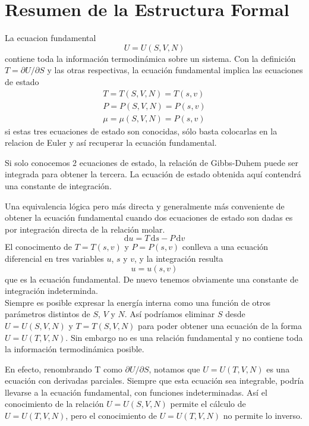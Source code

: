 \documentclass[10pt,twocolumn]{IEEEtran2e}
\newcommand{\ud}{\mathrm{d}}
\begin{document}
\section{Resumen de la Estructura Formal}
La ecuacion fundamental
\begin{equation}
 U=U(S,V,N)
\end{equation}
contiene toda la informaci\'on termodin\'amica sobre un sistema. Con la definici\'on $T=\partial U/\partial S$ y las otras respectivas, la ecuaci\'on fundamental implica las ecuaciones de estado
\begin{eqnarray}
T = T(S,V,N) = T(s,v) \\
P = P(S,V,N) = P(s,v) \\
\mu =\mu (S,V,N) = P(s,v)
\end{eqnarray}
si estas tres ecuaciones de estado son conocidas, s\'olo basta colocarlas en la relacion de Euler y as\'i recuperar la ecuaci\'on fundamental.

Si solo conocemos 2 ecuaciones de estado, la relaci\'on de Gibbs-Duhem puede ser integrada para obtener la tercera. La ecuaci\'on de estado obtenida aqu\'i contendr\'a una constante de integraci\'on.

Una equivalencia l\'ogica pero m\'as directa y generalmente m\'as conveniente de obtener la ecuaci\'on fundamental cuando dos ecuaciones de estado son dadas es por integraci\'on directa de la relaci\'on molar.
\begin{equation}
 \ud u = T\,\ud s - P\,\ud v
\end{equation}
El conocimento de $T=T(s,v)$ y $P=P(s,v)$ conlleva a una ecuaci\'on diferencial en tres variables $u$, $s$ y $v$, y la integraci\'on resulta
\begin{equation}
 u=u(s,v)
\end{equation}
que es la ecuaci\'on fundamental. De nuevo tenemos obviamente una constante de integraci\'on indeterminda.\\

Siempre es posible expresar la energ\'ia interna como una funci\'on de otros par\'ametros distintos de $S$, $V$ y $N$. As\'i podr\'iamos eliminar $S$ desde $U=U(S,V,N)$ y $T=T(S,V,N)$ para poder obtener una ecuaci\'on de la forma $U=U(T,V,N)$. Sin embargo no es una relaci\'on fundamental y no contiene toda la informaci\'on termodin\'amica posible.

En efecto, renombrando T como $\partial U/ \partial S$, notamos que $U=U(T,V,N)$ es una ecuaci\'on con derivadas parciales. Siempre que esta ecuaci\'on sea integrable, podr\'ia llevarse a la ecuaci\'on fundamental, con funciones indeterminadas. As\'i el conocimiento de la relaci\'on $U=U(S,V,N)$ permite el c\'alculo de $U=U(T,V,N)$, pero el conocimiento de $U=U(T,V,N)$ no permite lo inverso.\\
\end{document}
